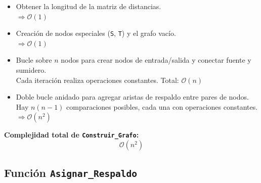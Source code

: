 \documentclass[a4paper, 12pt]{article}
\begin{document}
\begin{itemize}
    \item  Obtener la longitud de la matriz de distancias. \\
    \hspace*{1em} $\Rightarrow \mathcal{O}(1)$
    
    \item  Creación de nodos especiales (\texttt{S}, \texttt{T}) y el grafo vacío. \\
    \hspace*{1em} $\Rightarrow \mathcal{O}(1)$

    \item  Bucle sobre $n$ nodos para crear nodos de entrada/salida y conectar fuente y sumidero. \\
    \hspace*{1em} Cada iteración realiza operaciones constantes. Total: $\mathcal{O}(n)$

    \item  Doble bucle anidado para agregar aristas de respaldo entre pares de nodos. \\
    \hspace*{1em} Hay $n(n-1)$ comparaciones posibles, cada una con operaciones constantes. \\
    \hspace*{1em} $\Rightarrow \mathcal{O}(n^2)$
\end{itemize}

\vspace{0.5em}
\noindent\textbf{Complejidad total de \texttt{Construir\_Grafo}:}
\[
\boxed{\mathcal{O}(n^2)}
\]

\subsection{Función \texttt{Asignar\_Respaldo}}
\end{document}
